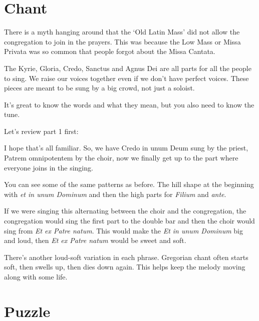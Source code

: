 \documentclass[12pt,a4paper]{article}
\begin{document}
\newpage

\section{Chant}

\begin{multicols}{2}

There is a myth hanging around that the `Old Latin Mass' did not allow the congregation to join in the prayers.  This was because the Low Mass or Missa Privata was so common that people forgot about the Missa Cantata.

The Kyrie, Gloria, Credo, Sanctus and Agnus Dei are all parts for all the people to sing.  We raise our voices together even if we don't have perfect voices.  These pieces are meant to be sung by a big crowd, not just a soloist.

It's great to know the words and what they mean, but you also need to know the tune.

Let's review part 1 first:


I hope that's all familiar.  So, we have Credo in unum Deum sung by the priest, Patrem omnipotentem by the choir, now we finally get up to the part where everyone joins in the singing.



You can see some of the same patterns as before.  The hill shape at the beginning with \emph{et in unum Dominum} and then the high parts for \emph{Filium} and \emph{ante}.

If we were singing this alternating between the choir and the congregation, the congregation would sing the first part to the double bar and then the choir would sing from \emph{Et ex Patre natum}.  This would make the \emph{Et in unum Dominum} big and loud, then \emph{Et ex Patre natum} would be sweet and soft.

There's another loud-soft variation in each phrase.  Gregorian chant often starts soft, then swells up, then dies down again.  This helps keep the melody moving along with some life.
\end{multicols}


\newpage

\section{Puzzle}
\end{document}
